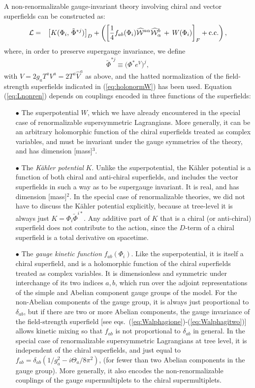 \documentclass[12pt]{article}
\def\beq{\begin{eqnarray}}
\def\eeq{\end{eqnarray}}
\begin{document}
A non-renormalizable gauge-invariant theory involving chiral and vector 
superfields can be constructed as:
\beq
{\cal L} &=& \left [ K(\Phi_i, \, \tilde \Phi^{*j}) \right ]_D
+ \left ( 
\left [\frac{1}{4}  f_{ab}(\Phi_i) \widehat{\cal W}^{a\alpha} \widehat{\cal W}^b_\alpha 
\,+\, W(\Phi_i)
\right ]_F
+ {\rm c.c.}
\right ),
\label{eq:Lnonren}
\eeq
where, in order to preserve supergauge invariance, we define
\beq
\tilde \Phi^{*j} \equiv \bigl ( \Phi^{*} e^{V} \bigr )^j ,
\eeq
with $V = 2 g_a T^a V^a = 2 T^a \widehat V^a$ as above,
and the hatted normalization of the field-strength superfields indicated in 
(\ref{eq:holonormW}) has been used.
Equation (\ref{eq:Lnonren})
depends on couplings encoded in three functions of the 
superfields:
\begin{itemize}
\item[$\bullet$]
The superpotential $W$, which we have already encountered in the
special case of renormalizable supersymmetric Lagrangians. More 
generally, it can be an arbitrary
holomorphic function of the chiral superfields treated as complex 
variables, and 
must be invariant under the gauge symmetries of the theory, and has 
dimension [mass]$^3$. 
\item[$\bullet$]
The {\em K\"ahler potential} $K$. 
Unlike the
superpotential, the K\"ahler potential is a function of both chiral and 
anti-chiral superfields, and includes the vector superfields in such a way 
as to be supergauge invariant. It is real, and has dimension 
[mass]$^2$. In the special
case of renormalizable theories, we did not have to discuss the K\"ahler
potential explicitly, because at tree-level it is always just 
$K = \Phi_i \tilde \Phi^{i*}$.
Any additive part of $K$ that is a chiral (or anti-chiral) 
superfield does not contribute to the 
action, since the $D$-term of a chiral superfield is a total derivative 
on spacetime.
\item[$\bullet$]
The {\it gauge kinetic function} $f_{ab}(\Phi_i)$. Like the
superpotential, it is itself a chiral superfield, and is a holomorphic 
function of the chiral superfields 
treated as
complex variables. It is dimensionless and symmetric under interchange of
its two indices $a,b$, which run over the adjoint representations of the
simple and Abelian component gauge groups of the model. For the 
non-Abelian components of the gauge 
group, it is always just proportional to $\delta_{ab}$, but if there are
two or more Abelian components, the gauge invariance of the field-strength 
superfield [see eqs.~(\ref{eq:Walphagione})-(\ref{eq:Walphagitwo})] 
allows kinetic mixing so that
$f_{ab}$ is not proportional to $\delta_{ab}$ in general.
In the special case of renormalizable
supersymmetric Lagrangians at tree level, it is 
independent of the chiral superfields, and just 
equal to $f_{ab} = \delta_{ab}(1/g_a^2 - i \Theta_a/8 \pi^2)$, 
(for fewer than two Abelian components in the gauge group). More generally, it also
encodes the non-renormalizable couplings of the gauge supermultiplets
to the chiral supermultiplets.
\end{itemize}
\end{document}
